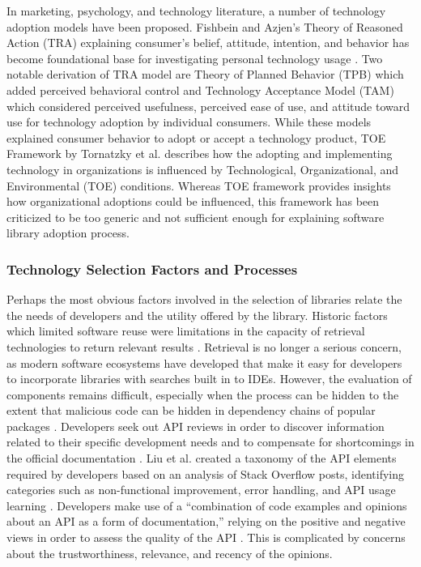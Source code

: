 In marketing, psychology, and technology literature, a number of technology adoption models have been proposed. Fishbein and Azjen's Theory of Reasoned Action (TRA) \cite{flanders1975belief-tra} explaining consumer's belief, attitude, intention, and behavior has become foundational base for investigating personal technology usage \cite{taherdoost2018-adoption-models}. Two notable derivation of TRA model are Theory of Planned Behavior (TPB) \cite{ajzen1991-tpb} which added perceived behavioral control and Technology Acceptance Model (TAM) \cite{davis1985tam, davis1989-tam-usefulness} which considered perceived usefulness, perceived ease of use, and attitude toward use for technology adoption by individual consumers. While these models explained consumer behavior to adopt or accept a technology product, TOE Framework by Tornatzky et al. \cite{tornatzky1990processes-toe} describes how the adopting and implementing technology in organizations is influenced by Technological, Organizational, and Environmental (TOE) conditions. Whereas TOE framework provides insights how organizational adoptions could be influenced, this framework has been criticized to be too generic \cite{zhu2005post-toe-critic} and not sufficient enough for explaining software library adoption process.



\subsubsection{Technology Selection Factors and Processes}\label{sec:lit:processes}

Perhaps the most obvious factors involved in the selection of libraries relate the the needs of developers and the utility offered by the library. Historic factors which limited software reuse were limitations in the capacity of retrieval technologies to return relevant results \cite{hummel2008code}. Retrieval is no longer a serious concern, as modern software ecosystems have developed that make it easy for developers to incorporate libraries with searches built in to IDEs. However, the evaluation of components remains difficult, especially when the process can be hidden to the extent that malicious code can be hidden in dependency chains of popular packages \cite{wyss2022wolf}. Developers seek out API reviews in order to discover information related to their specific development needs and to compensate for shortcomings in the official documentation \cite{uddin2019understanding}. Liu et al. created a taxonomy of the API elements required by developers based on an analysis of Stack Overflow posts, identifying categories such as non-functional improvement, error handling, and API usage learning \cite{liu2021api}. Developers make use of a ``combination of code examples and opinions about an API as a form of documentation,'' relying on the positive and negative views in order to assess the quality of the API \cite{uddin2019understanding}. This is complicated by concerns about the trustworthiness, relevance, and recency of the opinions. %

